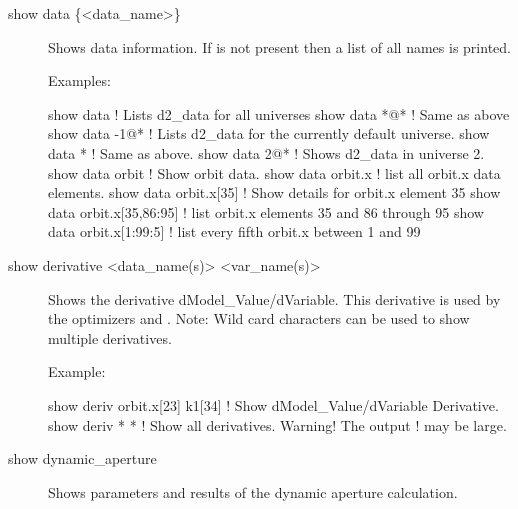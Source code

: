 {{{\begin{description}

\item[show data \{<data\_name>\}] \Newline

\vskip -0.2in

Shows data information. If  is not
present then a list of all  names is printed.

Examples:
\begin{example}
  show data                   ! Lists d2_data for all universes
  show data *@*               ! Same as above
  show data -1@*              ! Lists d2_data for the currently default universe.
  show data *                 ! Same as above.
  show data 2@*               ! Shows d2_data in universe 2.
  show data orbit             ! Show orbit data.
  show data orbit.x           ! list all orbit.x data elements.
  show data orbit.x[35]       ! Show details for orbit.x element 35
  show data orbit.x[35,86:95] ! list orbit.x elements 35 and 86 through 95
  show data orbit.x[1:99:5]   ! list every fifth orbit.x between 1 and 99  
\end{example}


\item[show derivative <data\_name(s)> <var\_name(s)>] \Newline

\vskip -0.2in

Shows the derivative dModel\_Value/dVariable. This derivative is used
by the optimizers  and . Note: Wild card characters can
be used to show multiple derivatives.

Example:
\begin{example}
  show deriv orbit.x[23] k1[34] ! Show dModel_Value/dVariable Derivative.
  show deriv * *                ! Show all derivatives. Warning! The output 
                                ! may be large.
\end{example}


\item[show dynamic_aperture] \Newline

\vskip -0.2in

Shows parameters and results of the dynamic aperture calculation.



\end{description}}}}
